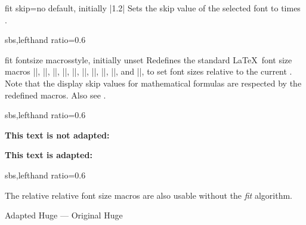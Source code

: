 \begin{docTcbKey}{fit skip}{=}{no default, initially |1.2|}
  Sets the skip value of the selected font to  times .

\begin{dispExample*}{sbs,lefthand ratio=0.6}

\begin{tcolorbox}[fit to=5cm and 4cm,
  fit skip=1.0  ]
  \lipsum[1]
\end{tcolorbox}
\end{dispExample*}
\end{docTcbKey}



\clearpage
\begin{docTcbKey}{fit fontsize macros}{}{style, initially unset}
  Redefines the standard \LaTeX\ font size macros
  |\tiny|, |\scriptsize|, |\footnotesize|, |\small|, |\normalsize|,
  |\large|, |\Large|, |\LARGE|, |\huge|, and |\Huge|,
  to set font sizes relative to
  the current . Note that the display skip values for
  mathematical formulas are respected by the redefined macros.
  Also see .

\begin{dispExample*}{sbs,lefthand ratio=0.6}

\begin{tcolorbox}[fit to height=4cm]
  {\Large\bfseries This text is
             not adapted:\par}
  \lipsum[2]
\end{tcolorbox}

\begin{tcolorbox}[fit to height=4cm,
  fit fontsize macros ]
  {\Large\bfseries This text is adapted:\par}
  \lipsum[2]
\end{tcolorbox}
\end{dispExample*}

\begin{dispExample*}{sbs,lefthand ratio=0.6}

\let\realHuge=\Huge

\begin{tcolorbox}[fit basedim=7pt,
  fontupper=\normalsize,
  fit fontsize macros]
The relative relative font size macros
are also usable without the
\textit{fit} algorithm.\par
{\Huge Adapted Huge} ---
{\realHuge Original Huge}
\end{tcolorbox}


\end{dispExample*}
\end{docTcbKey}

